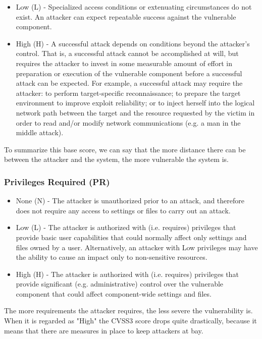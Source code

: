 \begin{itemize}
	\item Low (L) - Specialized access conditions or extenuating circumstances do not exist. An attacker can expect repeatable success against the vulnerable component.
	\item High (H) - A successful attack depends on conditions beyond the attacker's control. That is, a successful attack cannot be accomplished at will, but requires the attacker to invest in some measurable amount of effort in preparation or execution of the vulnerable component before a successful attack can be expected. For example, a successful attack may require the attacker: to perform target-specific reconnaissance; to prepare the target environment to improve exploit reliability; or to inject herself into the logical network path between the target and the resource requested by the victim in order to read and/or modify network communications (e.g. a man in the middle attack).
\end{itemize}

To summarize this base score, we can say that the more distance there can be between the attacker and the system, the more vulnerable the system is.

\subsubsection{Privileges Required (PR)}

\begin{itemize}
	\item None (N) - The attacker is unauthorized prior to an attack, and therefore does not require any access to settings or files to carry out an attack.
	\item Low (L) - The attacker is authorized with (i.e. requires) privileges that provide basic user capabilities that could normally affect only settings and files owned by a user. Alternatively, an attacker with Low privileges may have the ability to cause an impact only to non-sensitive resources.
	\item High (H) - The attacker is authorized with (i.e. requires) privileges that provide significant (e.g. administrative) control over the vulnerable component that could affect component-wide settings and files.
\end{itemize}

The more requirements the attacker requires, the less severe the vulnerability is. When it is regarded as "High" the CVSS3 score drops quite drastically, because it means that there are measures in place to keep attackers at bay.

